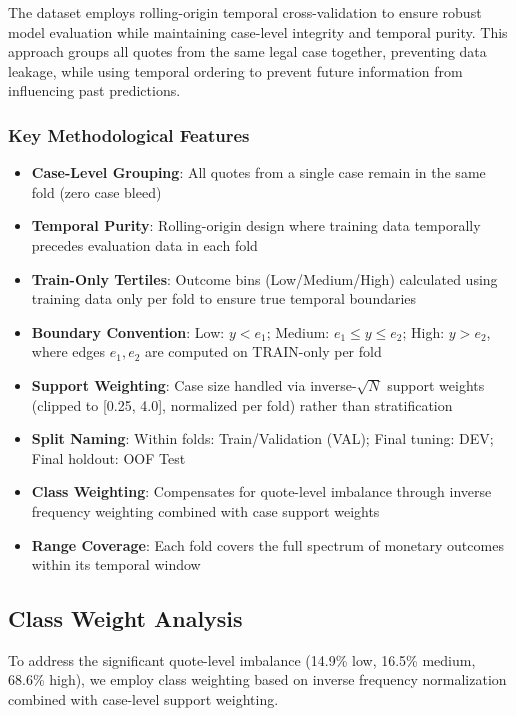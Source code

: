 \documentclass[11pt]{article}
\begin{document}
The dataset employs rolling-origin temporal cross-validation to ensure robust model evaluation while maintaining case-level integrity and temporal purity. This approach groups all quotes from the same legal case together, preventing data leakage, while using temporal ordering to prevent future information from influencing past predictions.

\subsubsection{Key Methodological Features}
\begin{itemize}
\item \textbf{Case-Level Grouping}: All quotes from a single case remain in the same fold (zero case bleed)
\item \textbf{Temporal Purity}: Rolling-origin design where training data temporally precedes evaluation data in each fold
\item \textbf{Train-Only Tertiles}: Outcome bins (Low/Medium/High) calculated using training data only per fold to ensure true temporal boundaries
\item \textbf{Boundary Convention}: Low: $y < e_1$; Medium: $e_1 \leq y \leq e_2$; High: $y > e_2$, where edges $e_1, e_2$ are computed on TRAIN-only per fold
\item \textbf{Support Weighting}: Case size handled via inverse-$\sqrt{N}$ support weights (clipped to [0.25, 4.0], normalized per fold) rather than stratification
\item \textbf{Split Naming}: Within folds: Train/Validation (VAL); Final tuning: DEV; Final holdout: OOF Test
\item \textbf{Class Weighting}: Compensates for quote-level imbalance through inverse frequency weighting combined with case support weights
\item \textbf{Range Coverage}: Each fold covers the full spectrum of monetary outcomes within its temporal window
\end{itemize}

\subsection{Class Weight Analysis}

To address the significant quote-level imbalance (14.9\% low, 16.5\% medium, 68.6\% high), we employ class weighting based on inverse frequency normalization combined with case-level support weighting.
\end{document}
